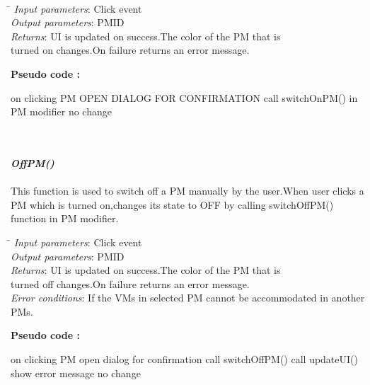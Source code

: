 \documentclass{article}
\begin{document}
\\\begin{tabbing}
  \hspace*{4cm}\= \kill
\emph{Input parameters}\>: Click event\\
\emph{Output parameters}\>: PM\textunderscore ID\\
\emph{Returns}\>: UI is updated on success.The color of the PM that is \\ \> turned on changes.On failure returns an error message.\\ 
\end{tabbing}
\textbf{Pseudo code :}
\begin{algorithmic}[1]
 \STATE on clicking PM 
 \STATE OPEN DIALOG FOR CONFIRMATION
 \STATE call switchOnPM() in PM modifier
 \ELSE 
 \STATE no change
 \ENDIF
 \ENDIF
\end{algorithmic}
\mbox{}\\\\
\emph{\bf OffPM()}
\\\\
This function is used to switch off a PM manually by the user.When user clicks a PM which is turned on,changes its state to OFF by calling switchOffPM() function in PM modifier.
\\\begin{tabbing}
  \hspace*{4cm}\= \kill
  \emph{Input parameters}\>: Click event\\
  \emph{Output parameters}\>: PM\textunderscore ID\\
  \emph{Returns}\>: UI is updated on success.The color of the PM that is \\ \> turned off changes.On failure returns an error message.\\
  \emph{Error conditions}\>: If the VMs in selected PM cannot be accommodated in another PMs.
  \end{tabbing}
  \textbf{Pseudo code :}
  \begin{algorithmic}[1]
   \STATE on clicking PM 
   \STATE open dialog for confirmation
   \STATE call switchOffPM()
   \STATE call updateUI()
   \ELSE 
   \STATE show error message
   \ENDIF
   \ELSE
   \STATE no change
   \ENDIF
   \ENDIF
  \end{algorithmic}
\end{document}
